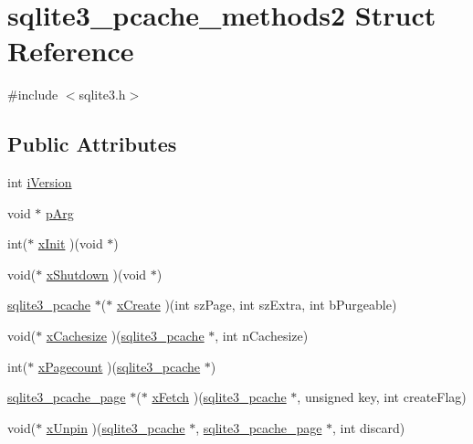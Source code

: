 \hypertarget{structsqlite3__pcache__methods2}{\section{sqlite3\-\_\-pcache\-\_\-methods2 Struct Reference}
\label{structsqlite3__pcache__methods2}
}


{\ttfamily \#include $<$sqlite3.\-h$>$}

\subsection*{Public Attributes}
\begin{DoxyCompactItemize}
\item 
int \hyperlink{structsqlite3__pcache__methods2_a03b27be6c7cb8f1d2662c454cbe58483}{i\-Version}
\item 
void $\ast$ \hyperlink{structsqlite3__pcache__methods2_a4bea91c33987eef02122bbf8a49745de}{p\-Arg}
\item 
int($\ast$ \hyperlink{structsqlite3__pcache__methods2_a8f77114458576c9d75cd53822fcd3462}{x\-Init} )(void $\ast$)
\item 
void($\ast$ \hyperlink{structsqlite3__pcache__methods2_a00a780e295b89976940cd3cba2cfeaee}{x\-Shutdown} )(void $\ast$)
\item 
\hyperlink{sqlite3_8c_a096c453d937d51f7926d7d31c8e0bd2f}{sqlite3\-\_\-pcache} $\ast$($\ast$ \hyperlink{structsqlite3__pcache__methods2_a91e7752b826e19e7c51c1fa0ce530f0f}{x\-Create} )(int sz\-Page, int sz\-Extra, int b\-Purgeable)
\item 
void($\ast$ \hyperlink{structsqlite3__pcache__methods2_a4889ab0903938f485aa0fa4fc6925d26}{x\-Cachesize} )(\hyperlink{sqlite3_8c_a096c453d937d51f7926d7d31c8e0bd2f}{sqlite3\-\_\-pcache} $\ast$, int n\-Cachesize)
\item 
int($\ast$ \hyperlink{structsqlite3__pcache__methods2_a5d51aba3927db1da9acf31fbdf7d57b5}{x\-Pagecount} )(\hyperlink{sqlite3_8c_a096c453d937d51f7926d7d31c8e0bd2f}{sqlite3\-\_\-pcache} $\ast$)
\item 
\hyperlink{structsqlite3__pcache__page}{sqlite3\-\_\-pcache\-\_\-page} $\ast$($\ast$ \hyperlink{structsqlite3__pcache__methods2_ac74dd2b35193a4309494311995da2d25}{x\-Fetch} )(\hyperlink{sqlite3_8c_a096c453d937d51f7926d7d31c8e0bd2f}{sqlite3\-\_\-pcache} $\ast$, unsigned key, int create\-Flag)
\item 
void($\ast$ \hyperlink{structsqlite3__pcache__methods2_ac94294551eda282f17b1ed2a110e1850}{x\-Unpin} )(\hyperlink{sqlite3_8c_a096c453d937d51f7926d7d31c8e0bd2f}{sqlite3\-\_\-pcache} $\ast$, \hyperlink{structsqlite3__pcache__page}{sqlite3\-\_\-pcache\-\_\-page} $\ast$, int discard)

\end{DoxyCompactItemize}
